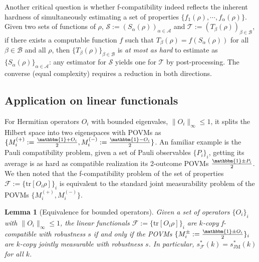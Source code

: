 \documentclass[aps,%
twocolumn,%
floatfix,%
pra,%
amsfonts,%
groupedaddress,%
superscriptaddress]{revtex4-2}%
\newtheorem{lemma}{Lemma}
\newcommand{\1}{\mathbbm{1}}
\newcommand*{\cF}{\mathcal{F}}
\begin{document}
Another critical question is whether f-compatibility indeed reflects the inherent hardness of simultaneously estimating a set of properties $\{f_1(\rho),\cdots,f_\alpha(\rho)\}$.
Given two sets of functions of $\rho$, $\mathcal{S}:= (S_\alpha(\rho))_{\alpha \in \mathcal{A}}$ and $\mathcal{T}:=(T_\beta(\rho))_{\beta \in \mathcal{B}}$, if there exists a computable function $f$ such that $T_\beta(\rho) = f(S_\alpha(\rho))$ for all $\beta \in \mathcal{B}$ and all $\rho$, then $\{T_\beta(\rho)\}_{\beta \in \mathcal{B}}$ is \emph{at most as hard} to estimate as $\{S_\alpha(\rho)\}_{\alpha \in \mathcal{A}}$: any estimator for $\mathcal{S}$ yields one for $\mathcal{T}$ by post-processing. The converse (equal complexity) requires a reduction in both directions.


\subsection{Application on linear functionals}
For Hermitian operators $O_i$ with bounded eigenvales, $\|O_i\|_{\infty} \leq 1$, it splits the Hilbert space into two eigenspaces with POVMs as $\{M_i^{(+)}:= \frac{\1 + O_i}{2},M_i^{(-)}:= \frac{\1 - O_i}{2}\}$.
An familiar example is the Pauli compatibility problem, given a set of Pauli observables $\{P_i\}_i$, getting its average is as hard as compatible realization its 2-outcome POVMs $\frac{\1 \pm P_i}{2}$.
We then noted that the f-compatibility problem of the set of properties $\mathcal{F}:= \{\mathrm{tr}[O_i\rho]\}_i$ is equivalent to the standard joint measurability problem of the POVMs $\{M_i^{(+)},M_i^{(-)}\}$.
 
\begin{lemma}[Equivalence for bounded operators]\label{thm:linear_functional_compatibility}
   Given a set of operators $\{O_i\}_i$ with $\|O_i\|_\infty \leq 1$, the linear functionals $\mathcal{F}:= \{\mathrm{tr}[O_i\rho]\}_i$ are $k$-copy f-compatible with robustness $s$ if and only if the POVMs $\{M_i^{\pm}:= \frac{\1 \pm O_i}{2}\}_i$ are $k$-copy jointly measurable with robustness $s$. In particular, $s^*_{\cF}(k) = s^*_{\mathrm{JM}}(k)$ for all $k$.
\end{lemma}
\end{document}
